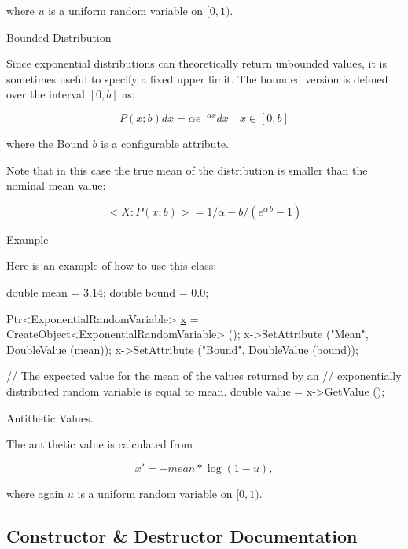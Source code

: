 where $u$ is a uniform random variable on $[0,1)$.

\begin{DoxyParagraph}{Bounded Distribution}

\end{DoxyParagraph}
Since exponential distributions can theoretically return unbounded values, it is sometimes useful to specify a fixed upper limit. The bounded version is defined over the interval $[0,b]$ as\+:

\[ P(x; b) dx = \alpha e^{-\alpha x} dx \quad x \in [0,b] \]

where the {\ttfamily Bound} $b$ is a configurable attribute.

Note that in this case the true mean of the distribution is smaller than the nominal mean value\+:

\[ <X: P(x; b)> = 1/\alpha - b/(e^{\alpha \, b} -1) \]

\begin{DoxyParagraph}{Example}

\end{DoxyParagraph}
Here is an example of how to use this class\+: 
\begin{DoxyCode}
\textcolor{keywordtype}{double} mean = 3.14;
\textcolor{keywordtype}{double} bound = 0.0;

Ptr<ExponentialRandomVariable> \hyperlink{lte__link__budget__x2__handover__measures_8m_a9336ebf25087d91c818ee6e9ec29f8c1}{x} = CreateObject<ExponentialRandomVariable> ();
x->SetAttribute (\textcolor{stringliteral}{"Mean"}, DoubleValue (mean));
x->SetAttribute (\textcolor{stringliteral}{"Bound"}, DoubleValue (bound));

\textcolor{comment}{// The expected value for the mean of the values returned by an}
\textcolor{comment}{// exponentially distributed random variable is equal to mean.}
\textcolor{keywordtype}{double} value = x->GetValue ();
\end{DoxyCode}


\begin{DoxyParagraph}{Antithetic Values.}

\end{DoxyParagraph}
The antithetic value is calculated from

\[ x' = - mean * \log(1 - u), \]

where again $u$ is a uniform random variable on $[0,1)$. 

\subsection{Constructor \& Destructor Documentation}
